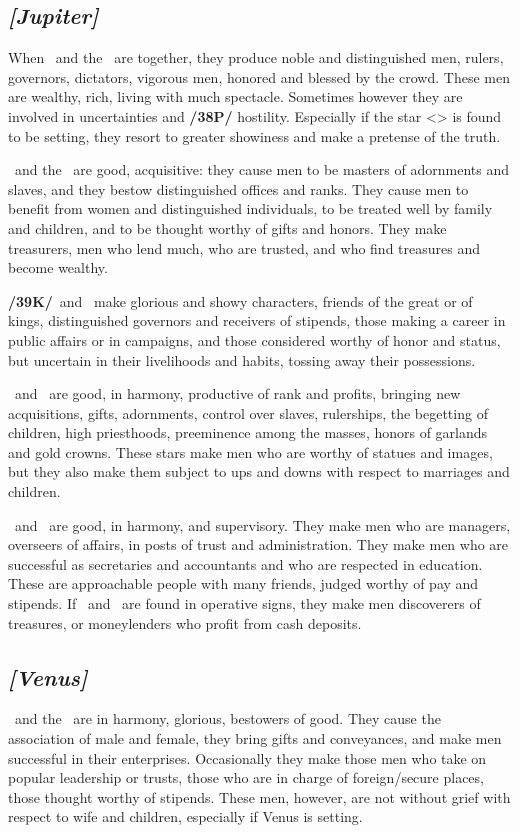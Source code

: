 \secbr
{}
\subsection{\textit{[Jupiter]}}
When \Jupiter\, and the \Sun\, are together, they produce noble and distinguished men, rulers, governors,
dictators, vigorous men, honored and blessed by the crowd. These men are wealthy, rich, living with much spectacle. Sometimes however they are involved in uncertainties and \textbf{/38P/} hostility. Especially if the star <\Jupiter> is found to be setting, they resort to greater showiness and make a pretense of the truth.

\Jupiter\, and the \Moon\, are good, acquisitive: they cause men to be masters of adornments and slaves, and they bestow distinguished offices and ranks. They cause men to benefit from women and distinguished individuals, to be treated well by family and children, and to be thought worthy of gifts and honors. They make treasurers, men who lend much, who are trusted, and who find treasures and become wealthy.

\textbf{/39K/}\Jupiter\, and \Mars\, make glorious and showy characters, friends of the great or of kings,
distinguished governors and receivers of stipends, those making a career in public affairs or in campaigns, and those considered worthy of honor and status, but uncertain in their livelihoods and habits, tossing away their possessions.

\Jupiter\, and \Venus\, are good, in harmony, productive of rank and profits, bringing new acquisitions,
gifts, adornments, control over slaves, rulerships, the begetting of children, high priesthoods, preeminence among the masses, honors of garlands and gold crowns. These stars make men who are worthy of statues and images, but they also make them subject to ups and downs with respect to marriages and children.

\Jupiter\, and \Mercury\, are good, in harmony, and supervisory. They make men who are managers, overseers of affairs, in posts of trust and administration. They make men who are successful as secretaries and accountants and who are respected in education. These are approachable people with many friends, judged worthy of pay and stipends. If \Jupiter\, and \Mercury\, are found in operative signs, they make men
discoverers of treasures, or moneylenders who profit from cash deposits.

\secbr
{}
\subsection{\textit{[Venus]}}
\Venus\, and the \Sun\, are in harmony, glorious, bestowers of good. They cause the association of male and female, they bring gifts and conveyances, and make men successful in their enterprises. Occasionally they make those men who take on popular leadership or trusts, those who are in charge of foreign/secure places, those thought worthy of stipends. These men, however, are not without grief with respect to wife and children, especially if Venus is setting.

